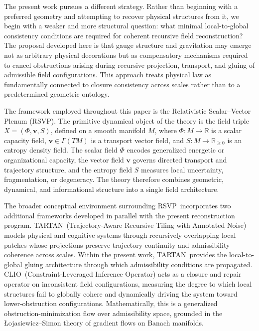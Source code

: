 \documentclass[12pt,a4paper]{article}
\newcommand{\RSVP}{\textrm{RSVP}}
\newcommand{\CLIO}{\textrm{CLIO}}
\newcommand{\TARTAN}{\textrm{TARTAN}}
\newcommand{\R}{\mathbb{R}}
\begin{document}
The present work pursues a different strategy. Rather than beginning with a
preferred geometry and attempting to recover physical structures from it, we
begin with a weaker and more structural question: what minimal local-to-global
consistency conditions are required for coherent recursive field reconstruction?
The proposal developed here is that gauge structure and gravitation may emerge
not as arbitrary physical decorations but as compensatory mechanisms required to
cancel obstructions arising during recursive projection, transport, and gluing
of admissible field configurations. This approach treats physical law as
fundamentally connected to closure consistency across scales rather than to a
predetermined geometric ontology.

The framework employed throughout this paper is the Relativistic Scalar--Vector
Plenum (\RSVP). The primitive dynamical object of the theory is the field triple
$X=(\Phi,\mathbf{v},S)$, defined on a smooth manifold $M$, where $\Phi: M\to\R$
is a scalar capacity field, $\mathbf{v}\in\Gamma(TM)$ is a transport vector
field, and $S: M\to\R_{\geq 0}$ is an entropy density field. The scalar field
$\Phi$ encodes generalized energetic or organizational capacity, the vector field
$\mathbf{v}$ governs directed transport and trajectory structure, and the
entropy field $S$ measures local uncertainty, fragmentation, or degeneracy. The
theory therefore combines geometric, dynamical, and informational structure into
a single field architecture.

The broader conceptual environment surrounding \RSVP\ incorporates two
additional frameworks developed in parallel with the present reconstruction
program. \TARTAN\ (Trajectory-Aware Recursive Tiling with Annotated Noise)
models physical and cognitive systems through recursively overlapping local
patches whose projections preserve trajectory continuity and admissibility coherence
across scales. Within the present work, \TARTAN\ provides the local-to-global
gluing architecture through which admissibility conditions are propagated.
\CLIO\ (Constraint-Leveraged Inference Operator) acts as a closure and repair
operator on inconsistent field configurations, measuring the degree to which
local structures fail to globally cohere and dynamically driving the system
toward lower-obstruction configurations. Mathematically, this is a generalized
obstruction-minimization flow over admissibility space, grounded in the
Łojasiewicz--Simon theory of gradient flows on Banach manifolds.
\end{document}
